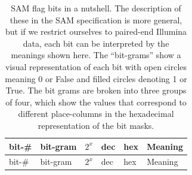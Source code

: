 \documentclass[]{krantz}
\begin{document}
\begin{longtable}[]{@{}llllll@{}}
\caption{\label{tab:sam-flags} SAM flag bits in a nutshell. The description of these in the SAM specification is more general, but if we restrict ourselves to paired-end Illumina data, each bit can be interpreted by the meanings shown here. The ``bit-grams'' show a visual representation of each bit with open circles meaning 0 or False and filled circles denoting 1 or True. The bit grams are broken into three groups of four, which show the values that correspond to different place-columns in the hexadecimal representation of the bit masks.}\tabularnewline
\toprule
\begin{minipage}[b]{0.09\columnwidth}\raggedright
bit-\#\strut
\end{minipage} & \begin{minipage}[b]{0.12\columnwidth}\raggedright
bit-gram\strut
\end{minipage} & \begin{minipage}[b]{0.12\columnwidth}\raggedright
\(2^x\)\strut
\end{minipage} & \begin{minipage}[b]{0.07\columnwidth}\raggedright
dec\strut
\end{minipage} & \begin{minipage}[b]{0.09\columnwidth}\raggedright
hex\strut
\end{minipage} & \begin{minipage}[b]{0.35\columnwidth}\raggedright
Meaning\strut
\end{minipage}\tabularnewline
\midrule
\endfirsthead
\toprule
\begin{minipage}[b]{0.09\columnwidth}\raggedright
bit-\#\strut
\end{minipage} & \begin{minipage}[b]{0.12\columnwidth}\raggedright
bit-gram\strut
\end{minipage} & \begin{minipage}[b]{0.12\columnwidth}\raggedright
\(2^x\)\strut
\end{minipage} & \begin{minipage}[b]{0.07\columnwidth}\raggedright
dec\strut
\end{minipage} & \begin{minipage}[b]{0.09\columnwidth}\raggedright
hex\strut
\end{minipage} & \begin{minipage}[b]{0.35\columnwidth}\raggedright
Meaning\strut
\end{minipage}\tabularnewline

\end{longtable}
\end{document}
